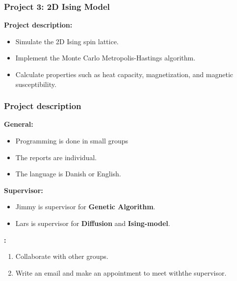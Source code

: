 \documentclass{beamer}
\begin{document}
{\begin{columns}[c]
    \end{columns}

}


\frame
{
    \frametitle{Project 3: 2D Ising Model}

    \textbf{Project description:}

    \bigskip

    \begin{itemize}

        \item Simulate the 2D Ising spin lattice.

        \bigskip

        \item Implement the Monte Carlo Metropolis-Hastings algorithm.

        \bigskip

        \item Calculate properties such as heat capacity, magnetization, and magnetic susceptibility.

    \end{itemize}

}


\frame
{

    \frametitle{Project description}

    \textbf{General:}

    \begin{itemize}

        \item Programming is done in small groups

        \item The reports are individual.

        \item The language is Danish or English.

    \end{itemize}

    \bigskip

    \textbf{Supervisor:}

    \begin{itemize}

        \item Jimmy is supervisor for {\bf Genetic Algorithm}.

        \item Lars is supervisor for {\bf Diffusion} and {\bf Ising-model}.

    \end{itemize}

    \bigskip

    \textbf{:}

    \begin{enumerate}

        \item Collaborate with other groups.

        \item Write an email and make an appointment to meet with\newline the supervisor.

    \end{enumerate}

}


\end{document}

